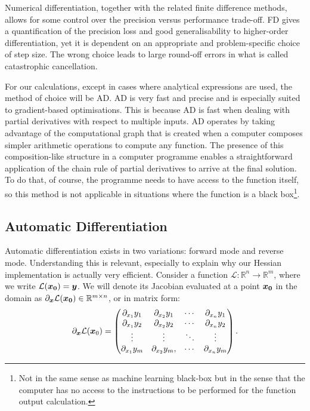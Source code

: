 Numerical differentiation, together with the related finite difference methods, allows for some control over the precision versus performance trade-off. FD gives a quantification of the precision loss and good generalisability to higher-order differentiation, yet it is dependent on an appropriate and problem-specific choice of step size. The wrong choice leads to large round-off errors in what is called catastrophic cancellation.

For our calculations, except in cases where analytical expressions are used, the method of choice will be AD. AD is very fast and precise and is especially suited to gradient-based optimisations. This is because AD is fast when dealing with partial derivatives with respect to multiple inputs. AD operates by taking advantage of the computational graph that is created when a computer composes simpler arithmetic operations to compute any function. The presence of this composition-like structure in a computer programme enables a straightforward application of the chain rule of partial derivatives to arrive at the final solution. To do that, of course, the programme needs to have access to the function itself, so this method is not applicable in situations where the function is a black box\footnote{Not in the same sense as machine learning black-box but in the sense that the computer has no access to the instructions to be performed for the function output calculation.}.

\subsection{Automatic Differentiation}\label{sec:ad}
Automatic differentiation exists in two variations: forward mode and reverse mode. Understanding this is relevant, especially to explain why our Hessian implementation is actually very efficient. Consider a function $\mathcal{L} : \mathbb{R}^n \to \mathbb{R}^m$, where we write $\mathcal{L}(\boldsymbol{x_0}) = \boldsymbol{y}$. We will denote its Jacobian evaluated at a point $\boldsymbol{x_0}$ in the domain as $\partial_{\boldsymbol{x}} \mathcal{L}(\boldsymbol{x_0}) \in \mathbb{R}^{m \times n}$, or in matrix form:
\begin{align*}
    \partial_{\boldsymbol{x}} \mathcal{L}(\boldsymbol{x}_0) = \begin{pmatrix} \partial_{x_1} y_1 & \partial_{x_2} y_1 & \cdots & \partial_{x_n} y_1 \\ \partial_{x_1} y_2 & \partial_{x_2} y_2 & \cdots & \partial_{x_n} y_2 \\ \vdots & \vdots & \ddots & \vdots \\ \partial_{x_1} y_m & \partial_{x_2} y_m, & \cdots & \partial_{x_n} y_m \end{pmatrix}.
\end{align*}

